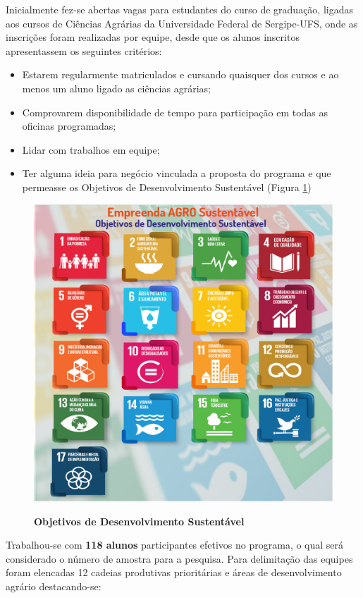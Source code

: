 Inicialmente fez-se abertas vagas para estudantes do curso de graduação, ligadas aos cursos de Ciências Agrárias da Universidade Federal de Sergipe-UFS, onde as inscrições foram realizadas por equipe, desde que os alunos inscritos apresentassem os seguintes critérios:

	
\begin{itemize}
\item{Estarem regularmente matriculados e cursando quaisquer dos cursos e ao menos um aluno ligado as ciências agrárias;}
\item{Comprovarem disponibilidade de tempo para participação em todas as oficinas programadas;}
\item{Lidar com trabalhos em equipe;}
\item{Ter alguma ideia para negócio vinculada a proposta do programa e que permeasse os Objetivos de Desenvolvimento Sustentável (Figura \ref{figura_ods})}
\end{itemize}


\begin{figure}[!h]
\centering
\caption{\textbf{Objetivos de Desenvolvimento Sustentável}}
\includegraphics[scale=0.2]{Imagens/ODS_GERAL.png}
\label{figura_ods}
\end{figure}

Trabalhou-se com \textbf{118 alunos} participantes efetivos no programa, o qual será considerado o número de amostra para a pesquisa. Para delimitação das equipes foram elencadas 12 cadeias produtivas  prioritárias e áreas de desenvolvimento agrário destacando-se:

